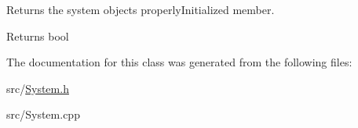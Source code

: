 Returns the system object\textquotesingle{}s properly\+Initialized member. 

\begin{DoxyReturn}{Returns}
bool 
\end{DoxyReturn}


The documentation for this class was generated from the following files\+:\begin{DoxyCompactItemize}
\item 
src/\hyperlink{System_8h}{System.\+h}\item 
src/System.\+cpp\end{DoxyCompactItemize}
